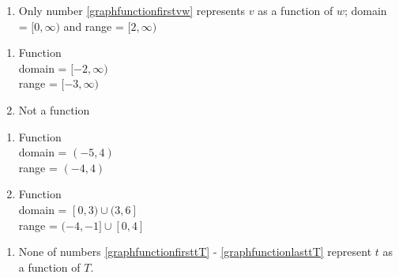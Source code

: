 \begin{enumerate}
\setcounter{enumi}{\value{HW}}

\item Only number \ref{graphfunctionfirstvw} represents $v$ as a function of $w$;  domain = $[0, \infty)$ and range = $[2, \infty)$

\setcounter{HW}{\value{enumi}}
\end{enumerate}

\begin{multicols}{2}
\begin{enumerate}
\setcounter{enumi}{\value{HW}}

\item  Function \\  domain =  $[-2, \infty)$ \\ range = $[-3, \infty)$

\vfill

\columnbreak

\item Not a function

\setcounter{HW}{\value{enumi}}
\end{enumerate}
\end{multicols}


\begin{multicols}{2}
\begin{enumerate}
\setcounter{enumi}{\value{HW}}

\item Function \\  domain =  $(-5, 4)$ \\ range = $(-4, 4)$

\vfill

\columnbreak

\item  Function \\ domain = $[0,3) \cup (3,6]$ \\ range = $(-4,-1] \cup [0,4]$

\setcounter{HW}{\value{enumi}}
\end{enumerate}
\end{multicols}

\begin{enumerate}
\setcounter{enumi}{\value{HW}}

\item None of numbers \ref{graphfunctionfirsttT} - \ref{graphfunctionlasttT}  represent $t$ as a function of $T$.

\setcounter{HW}{\value{enumi}}
\end{enumerate}



